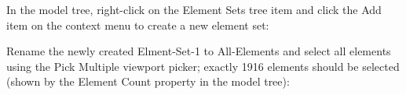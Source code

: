 \documentclass[
    11pt,        %
    a4paper,     %
    final,       %
    fleqn,       %
    notitlepage, %
    onecolumn,   %
    oneside,     %
]{article}
\begin{document}
In the model tree, right-click on the Element Sets tree item and click the Add item on the context menu to create a new element set:
\begin{center}
\end{center}

Rename the newly created Elment-Set-1 to All-Elements and select all elements using the Pick Multiple viewport picker; exactly 1916 elements should be selected (shown by the Element Count property in the model tree):
\begin{center}
\end{center}
\end{document}
